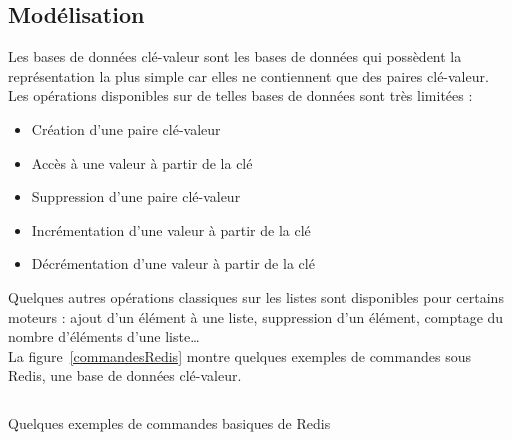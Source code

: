 \subsection{Modélisation}
	Les bases de données clé-valeur sont les bases de données qui possèdent la représentation la plus simple car elles ne contiennent que des paires clé-valeur. Les opérations disponibles sur de telles bases de données sont très limitées :
	\begin{itemize}
		\item Création d'une paire clé-valeur 
		\item Accès à une valeur à partir de la clé
		\item Suppression d'une paire clé-valeur
		\item Incrémentation d'une valeur à partir de la clé
		\item Décrémentation d'une valeur à partir de la clé
	\end{itemize}
	\vspace{20px}
	Quelques autres opérations classiques sur les listes sont disponibles pour certains moteurs : ajout d'un élément à une liste, suppression d'un élément, comptage du nombre d'éléments d'une liste\dots\\

	La figure~\ref{commandesRedis} montre quelques exemples de commandes sous Redis, une base de données clé-valeur.

	\begin{listing}[H]
		\inputminted{text}{code/commandesRedis.txt}
		\caption{Quelques exemples de commandes basiques de Redis}
		\label{commandesRedis}
	\end{listing}

